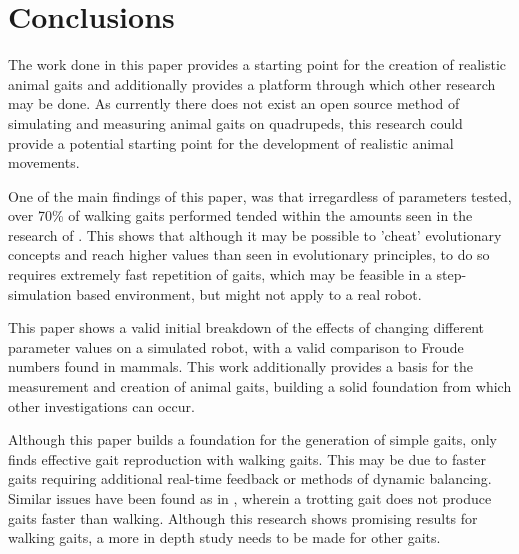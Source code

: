 \chapter{Conclusions}


The work done in this paper provides a starting point for the creation of realistic animal gaits and additionally provides a platform through which other research may be done. As currently there does not exist an open source method of simulating and measuring animal gaits on quadrupeds, this research could provide a potential starting point for the development of realistic animal movements.

One of the main findings of this paper, was that irregardless of parameters tested, over 70\% of walking gaits performed tended within the amounts seen in the research of \cite{Alexander1983}. This shows that although it may be possible to 'cheat' evolutionary concepts and reach higher values than seen in evolutionary principles, to do so requires extremely fast repetition of gaits, which may be feasible in a step-simulation based environment, but might not apply to a real robot. 

This paper shows a valid initial breakdown of the effects of changing different parameter values on a simulated robot, with a valid comparison to Froude numbers found in mammals. This work additionally provides a basis for the measurement and creation of animal gaits, building a solid foundation from which other investigations can occur. 

Although this paper builds a foundation for the generation of simple gaits, only finds effective gait reproduction with walking gaits. This may be due to faster gaits requiring additional real-time feedback or methods of dynamic balancing. Similar issues have been found as in \cite{Rutishauser2008}, wherein a trotting gait does not produce gaits faster than walking. Although this research shows promising results for walking gaits, a more in depth study needs to be made for other gaits.
